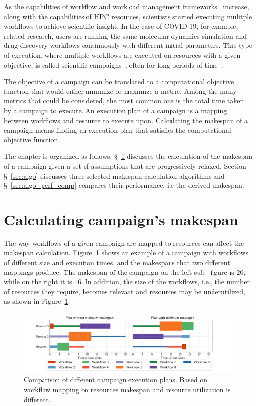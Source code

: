 \label{campaigns}
As the capabilities of workflow and workload management frameworks~\cite{balasubramanian2018harnessing,deelman2015pegasus,maeno2008panda} increase, along with the capabilities of HPC resources, scientists started executing mulitple workflows to achieve scientific insight.
In the case of COVID-19, for example, related research, users are running the same molecular dynamics simulation and drug discovery workflows continuously with different initial parameters.
This type of execution, where multiple workflows are executed on resources with a given objective, is called scientific campaigns~\cite{maeno2008panda}, often for long periods of time~\cite{casajus2010dirac}.

The objective of a campaign can be translated to a computational objective function that would either minimize or maximize a metric.
Among the many metrics that could be considered, the most common one is the total time taken by a campaign to execute.
An execution plan of a campaign is a mapping between workflows and resource to execute upon.
Calculating the makespan of a campaign means finding an execution plan that satisfies the computational objective function.

The chapter is organized as follows: \S~\ref{sec:makespan_calc} discusses the calculation of the makespan of a campaign given a set of assumptions that are progressively relaxed.
Section \S~\ref{sec:algo} discusses three selected makespan calculation algorithms and \S~\ref{sec:algo_perf_comp} compares their performance, i.e the derived makespan.

\section{Calculating campaign's makespan}
\label{sec:makespan_calc}
The way workflows of a given campaign are mapped to resources can affect the makespan calculation. 
Figure~\ref{fig:example_makespan} shows an example of a campaign with workflows of different size and execution times, and the makespans that two different mappings produce.
The makespan of the campaign on the left sub~-figure is $20$, while on the right it is $16$.
In addition, the size of the workflows, i.e., the number of resources they require, becomes relevant and resources may be underutilized, as shown in Figure~\ref{fig:example_makespan}.

\begin{figure}[ht!]
    \centering
    \includegraphics[width=.99\textwidth]{figures/campaign/plan_comp.pdf}
    \caption{Comparison of different campaign execution plans. Based on workflow mapping on resources makespan and resource utilization is different.}\label{fig:example_makespan}
\end{figure}


